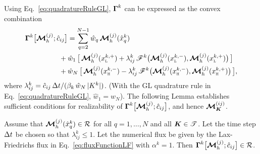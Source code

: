 Using Eq.~\eqref{eq:quadratureRuleGL}, $\boldsymbol{\Gamma}^{k}$ can be expressed as the convex combination
\begin{align}
  \vect{\Gamma}^{k}\big[\bcM_{h}^{(j)};\hat{c}_{ij}\big]
  &=\sum_{q=2}^{N-1}\hat{w}_{q}\,\vect{\cM}_{h}^{(j)}(\hat{x}_{q}^{k}) \nonumber \\
  &\hspace{-12pt}
  +\hat{w}_{1}\,\big[\,\vect{\cM}_{h}^{(j)}(\xL^{k,+})+\lambda_{ij}^{k}\,\mathscr{F}^{k}\big(\vect{\cM}_{h}^{(j)}(\xL^{k,-}),\vect{\cM}_{h}^{(j)}(\xL^{k,+})\big)\,\big] \nonumber \\
  &\hspace{-12pt}
  +\hat{w}_{N}\,\big[\,\vect{\cM}_{h}^{(j)}(\xH^{k,-})-\lambda_{ij}^{k}\,\mathscr{F}^{k}\big(\vect{\cM}_{h}^{(j)}(\xH^{k,-}),\vect{\cM}_{h}^{(j)}(\xH^{k,+})\big)\,\big],
  \label{eq:realizableGammaConvex}
\end{align}
where $\lambda_{ij}^{k}=\hat{c}_{ij}\,\Delta t/(\beta_{k}\,\hat{w}_{N}\,|K^{k}|)$.  
(With the GL quadrature rule in Eq.~\eqref{eq:quadratureRuleGL}, $\hat{w}_{1}=\hat{w}_{N}$).  
The following Lemma establishes sufficient conditions for realizability of $\boldsymbol{\Gamma}^{k}\big[\boldsymbol{\mathcal{M}}_{h}^{(j)};\hat{c}_{ij}\big]$, and hence $\boldsymbol{\mathcal{M}}_{\boldsymbol{K}}^{(ij)}$.  
\begin{lemma}
  Assume that $\boldsymbol{\mathcal{M}}_{h}^{(j)}(\hat{x}_{q}^{k})\in\mathcal{R}$ for all $q=1,\ldots,N$ and all $\boldsymbol{K}\in\mathscr{T}$.  
  Let the time step $\Delta t$ be chosen so that $\lambda_{ij}^{k}\le1$.  
  Let the numerical flux be given by the Lax-Friedrichs flux in Eq.~\eqref{eq:fluxFunctionLF} with $\alpha^{k}=1$.  
  Then $\boldsymbol{\Gamma}^{k}\big[\boldsymbol{\mathcal{M}}_{h}^{(j)};\hat{c}_{ij}\big]\in\mathcal{R}$.  
  \label{lem:realizableGamma}
\end{lemma}
